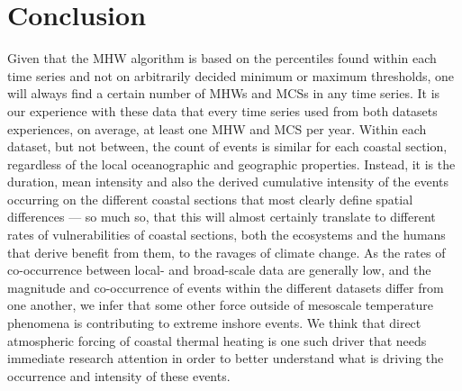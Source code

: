\documentclass[a4paper,10pt,review]{elsarticle}
\begin{document}
\section{Conclusion}
Given that the MHW algorithm is based on the percentiles found within each time series and not on arbitrarily decided minimum or maximum thresholds, one will always find a certain number of MHWs and MCSs in any time series. It is our experience with these data that every time series used from both datasets experiences, on average, at least one MHW and MCS per year. Within each dataset, but not between, the count of events is similar for each coastal section, regardless of the local oceanographic and geographic properties. Instead, it is the duration, mean intensity and also the derived cumulative intensity of the events occurring on the different coastal sections that most clearly define spatial differences --- so much so, that this will almost certainly translate to different rates of vulnerabilities of coastal sections, both the ecosystems and the humans that derive benefit from them, to the ravages of climate change. As the rates of co-occurrence between local- and broad-scale data are generally low, and the magnitude and co-occurrence of events within the different datasets differ from one another, we infer that some other force outside of mesoscale temperature phenomena is contributing to extreme inshore events. We think that direct atmospheric forcing of coastal thermal heating is one such driver that needs immediate research attention in order to better understand what is driving the occurrence and intensity of these events.
\end{document}
